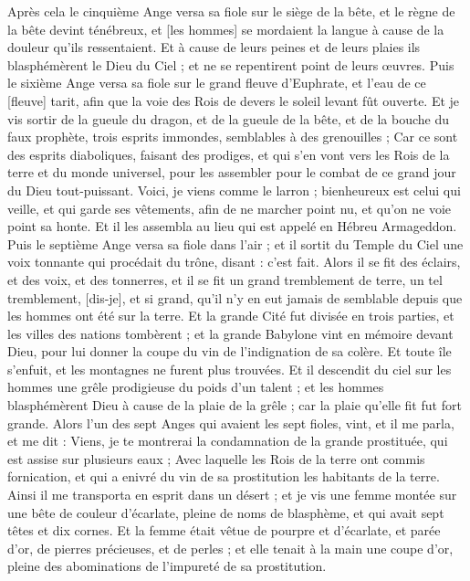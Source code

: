 \begin{multicols}{2}
Après cela le cinquième Ange versa sa fiole sur le siège de la bête, et le règne de la bête devint ténébreux, et [les hommes] se mordaient la langue à cause de la douleur qu'ils ressentaient.
Et à cause de leurs peines et de leurs plaies ils blasphémèrent le Dieu du Ciel ; et ne se repentirent point de leurs œuvres.
Puis le sixième Ange versa sa fiole sur le grand fleuve d'Euphrate, et l'eau de ce [fleuve] tarit, afin que la voie des Rois de devers le soleil levant fût ouverte.
Et je vis sortir de la gueule du dragon, et de la gueule de la bête, et de la bouche du faux prophète, trois esprits immondes, semblables à des grenouilles ;
Car ce sont des esprits diaboliques, faisant des prodiges, et qui s'en vont vers les Rois de la terre et du monde universel, pour les assembler pour le combat de ce grand jour du Dieu tout-puissant.
Voici, je viens comme le larron ; bienheureux est celui qui veille, et qui garde ses vêtements, afin de ne marcher point nu, et qu'on ne voie point sa honte.
Et il les assembla au lieu qui est appelé en Hébreu Armageddon.
Puis le septième Ange versa sa fiole dans l'air ; et il sortit du Temple du Ciel une voix tonnante qui procédait du trône, disant : c'est fait.
Alors il se fit des éclairs, et des voix, et des tonnerres, et il se fit un grand tremblement de terre, un tel tremblement, [dis-je], et si grand, qu'il n'y en eut jamais de semblable depuis que les hommes ont été sur la terre.
Et la grande Cité fut divisée en trois parties, et les villes des nations tombèrent ; et la grande Babylone vint en mémoire devant Dieu, pour lui donner la coupe du vin de l'indignation de sa colère.
Et toute île s'enfuit, et les montagnes ne furent plus trouvées.
Et il descendit du ciel sur les hommes une grêle prodigieuse du poids d'un talent ; et les hommes blasphémèrent Dieu à cause de la plaie de la grêle ; car la plaie qu'elle fit fut fort grande.
\VerseOne{}Alors l'un des sept Anges qui avaient les sept fioles, vint, et il me parla, et me dit : Viens, je te montrerai la condamnation de la grande prostituée, qui est assise sur plusieurs eaux ;
Avec laquelle les Rois de la terre ont commis fornication, et qui a enivré du vin de sa prostitution les habitants de la terre.
Ainsi il me transporta en esprit dans un désert ; et je vis une femme montée sur une bête de couleur d'écarlate, pleine de noms de blasphème, et qui avait sept têtes et dix cornes.
Et la femme était vêtue de pourpre et d'écarlate, et parée d'or, de pierres précieuses, et de perles ; et elle tenait à la main une coupe d'or, pleine des abominations de l'impureté de sa prostitution.

\end{multicols}
